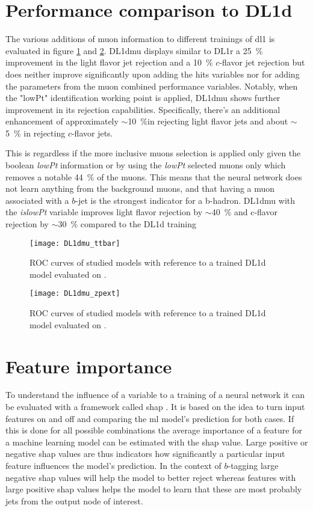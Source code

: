 \section{Performance comparison to DL1d}
The various additions of muon information to different trainings of \ac{dl1} is evaluated in figure \ref{fig:DL1dmu_ttbar} and \ref{fig:DL1dmu_zpext}. DL1dmu displays similar to DL1r a \qty{25}{\percent} improvement in the light flavor jet rejection and a \qty{10}{\percent} $c$-flavor jet rejection but does neither improve significantly upon adding the hits variables nor for adding the parameters from the muon combined performance variables. Notably, when the "lowPt" identification working point is applied, DL1dmu shows further improvement in its rejection capabilities. Specifically, there's an additional enhancement of approximately $\sim$\qty{10}{\percent}in rejecting light flavor jets and about $\sim$\SI{5}{\percent} in rejecting $c$-flavor jets.

This is regardless if the more inclusive muons selection is applied only given the boolean \textit{lowPt} information or by using the \textit{lowPt} selected muons only which removes a notable \qty{44}{\percent} of the muons. This means that the neural network does not learn anything from the background muons, and that having a muon associated with a $b$-jet is the strongest indicator for a b-hadron. DL1dmu with the \textit{islowPt} variable improves light flavor rejection by $\sim$\qty{40}{\percent} and c-flavor rejection by $\sim$\qty{30}{\percent} compared to the DL1d training

\begin{figure}[]
  \centering
  \texttt{[image: DL1dmu\_ttbar]}
  \caption{ROC curves of studied models with reference to a trained DL1d model evaluated on \ttbar.}
  \label{fig:DL1dmu_ttbar}
\end{figure}
\begin{figure}[]
  \centering
  \texttt{[image: DL1dmu\_zpext]}
  \caption{ROC curves of studied models with reference to a trained DL1d model evaluated on \Zprime.}
  \label{fig:DL1dmu_zpext}
\end{figure}

\section{Feature importance}
To understand the influence of a variable to a training of a neural network it can be evaluated with a framework called \ac{shap} \citep{shap,NIPS2017_7062}. It is based on the idea to turn input features on and off and comparing the \ac{ml} model's prediction for both cases. If this is done for all possible combinations the average importance of a feature for a machine learning model can be estimated with the \ac{shap} value. Large positive or negative \ac{shap} values are thus indicators how significantly a particular input feature influences the model's prediction. In the context of $b$-tagging large negative \ac{shap} values will help the model to better reject whereas features with large positive \ac{shap} values helps the model to learn that these are most probably jets from the output node of interest.

